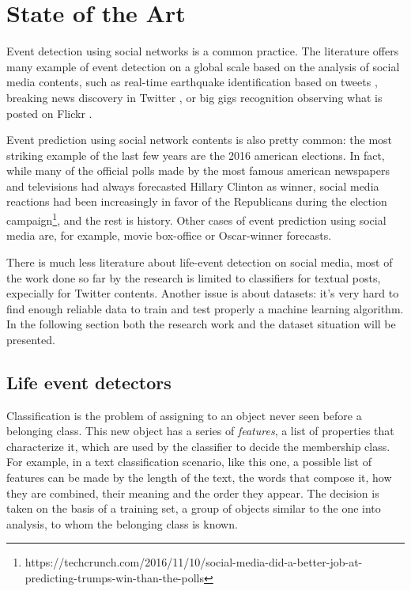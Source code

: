 \chapter{State of the Art}
\label{cha:intro}
Event detection using social networks is a common practice. The literature offers many example of event detection on a global scale based on the analysis of social media contents, such as real-time earthquake identification based on tweets \cite{sakaki2010earthquake}, breaking news discovery in Twitter \cite{jackoway2011identification, phuvipadawat2010breaking}, or big gigs recognition observing what is posted on Flickr \cite{liu2011using}.

Event prediction using social network contents is also pretty common: the most striking example of the last few years are the 2016 american elections. In fact, while many of the official polls made by the most famous american newspapers and televisions had always forecasted Hillary Clinton as winner, social media reactions had been increasingly in favor of the Republicans during the election campaign\footnote{https://techcrunch.com/2016/11/10/social-media-did-a-better-job-at-predicting-trumps-win-than-the-polls}, and the rest is history. Other cases of event prediction using social media are, for example, movie box-office \cite{asur2010predicting} or Oscar-winner forecasts.

There is much less literature about life-event detection on social media, most of the work done so far by the research is limited to classifiers for textual posts, expecially for Twitter contents. Another issue is about datasets: it's very hard to find enough reliable data to train and test properly a machine learning algorithm. In the following section both the research work and the dataset situation will be presented.

\section{Life event detectors}
\label{sec:classifiers}
Classification is the problem of assigning to an object never seen before a belonging class. This new object has a series of \textit{features}, a list of properties that characterize it, which are used by the classifier to decide the membership class. For example, in a text classification scenario, like this one, a possible list of features can be made by the length of the text, the words that compose it, how they are combined, their meaning and the order they appear. The decision is taken on the basis of a training set, a group of objects similar to the one into analysis, to whom the belonging class is known. 

